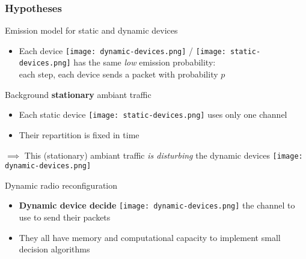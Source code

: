 \subsubsection{Hypotheses}

\begin{frameO}

    \begin{lightblock}{Emission model for static and dynamic devices}

        \begin{itemize}
            \item
                Each device \texttt{[image: dynamic-devices.png]} / \texttt{[image: static-devices.png]}  has the same \emph{low} emission probability: \\
                each step, each device sends a packet with probability \(p\)
        \end{itemize}

    \end{lightblock}

    \vspace*{5pt}
    \pause
    \begin{colorblock}{Background \textbf{stationary} ambiant traffic}

        \begin{itemize}
            \item
                  Each static device \texttt{[image: static-devices.png]} uses only one channel
            \item
                  Their repartition is fixed in time
        \end{itemize}

        \(\implies\) This (stationary) ambiant traffic \emph{is disturbing} the dynamic devices \texttt{[image: dynamic-devices.png]}
    \end{colorblock}

    \vspace*{5pt}
    \pause
    \begin{colorblock}{Dynamic radio reconfiguration}

        \begin{itemize}
            \item
                \textbf{Dynamic device decide} \texttt{[image: dynamic-devices.png]}  the channel to use to send their packets
            \item
                They all have memory and computational capacity to implement small decision algorithms
        \end{itemize}

    \end{colorblock}

\end{frameO}


